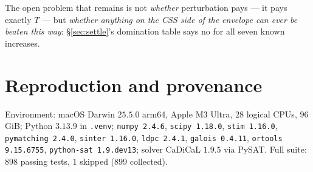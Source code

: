 \documentclass[11pt]{article}
\theoremstyle{plain}
\theoremstyle{remark}
\begin{document}
The open problem that remains is not \emph{whether} perturbation pays --- it pays
exactly $T$ --- but \emph{whether anything on the CSS side of the envelope can ever be
beaten this way}: \S\ref{sec:settle}'s domination table says no for all seven known increases.

\section{Reproduction and provenance}\label{sec:repro}

Environment: macOS Darwin $25.5.0$ arm64, Apple M3 Ultra, $28$ logical CPUs, $96$ GiB;
Python $3.13.9$ in \texttt{.venv}; \texttt{numpy 2.4.6}, \texttt{scipy 1.18.0},
\texttt{stim 1.16.0}, \texttt{pymatching 2.4.0}, \texttt{sinter 1.16.0}, \texttt{ldpc 2.4.1},
\texttt{galois 0.4.11}, \texttt{ortools 9.15.6755}, \texttt{python-sat 1.9.dev13}; solver CaDiCaL
$1.9.5$ via PySAT. Full suite: $898$ passing tests, $1$ skipped ($899$ collected).
\end{document}
